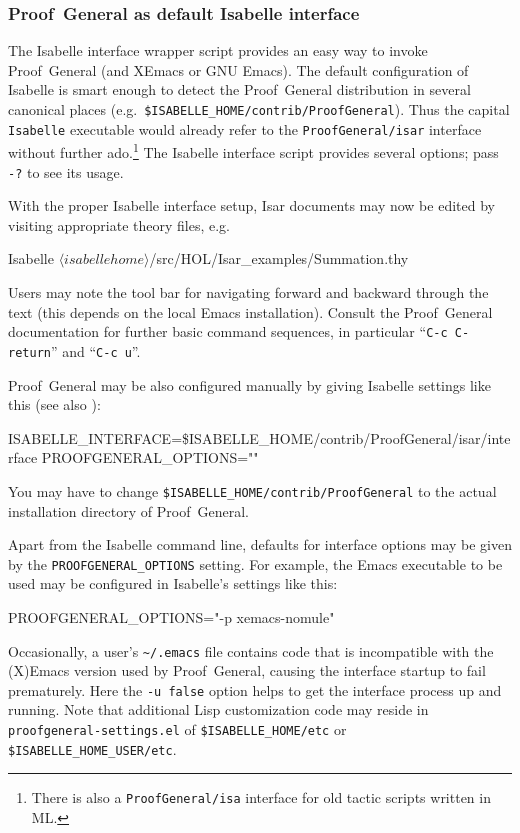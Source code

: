 \subsubsection{Proof~General as default Isabelle interface}

The Isabelle interface wrapper script provides an easy way to invoke
Proof~General (and XEmacs or GNU Emacs).  The default configuration of
Isabelle is smart enough to detect the Proof~General distribution in several
canonical places (e.g.\ \texttt{\$ISABELLE_HOME/contrib/ProofGeneral}).  Thus
the capital \texttt{Isabelle} executable would already refer to the
\texttt{ProofGeneral/isar} interface without further ado.\footnote{There is
  also a \texttt{ProofGeneral/isa} interface for old tactic scripts written in
  ML.} The Isabelle interface script provides several options; pass \verb,-?,
to see its usage.

With the proper Isabelle interface setup, Isar documents may now be edited by
visiting appropriate theory files, e.g.\ 
\begin{ttbox}
Isabelle \({\langle}isabellehome{\rangle}\)/src/HOL/Isar_examples/Summation.thy
\end{ttbox}
Users may note the tool bar for navigating forward and backward through the
text (this depends on the local Emacs installation).  Consult the
Proof~General documentation \cite{proofgeneral} for further basic command
sequences, in particular ``\texttt{C-c C-return}'' and ``\texttt{C-c u}''.

\medskip

Proof~General may be also configured manually by giving Isabelle settings like
this (see also \cite{isabelle-sys}):
\begin{ttbox}
ISABELLE_INTERFACE=\$ISABELLE_HOME/contrib/ProofGeneral/isar/interface
PROOFGENERAL_OPTIONS=""
\end{ttbox}
You may have to change \texttt{\$ISABELLE_HOME/contrib/ProofGeneral} to the
actual installation directory of Proof~General.

\medskip

Apart from the Isabelle command line, defaults for interface options may be
given by the \texttt{PROOFGENERAL_OPTIONS} setting.  For example, the Emacs
executable to be used may be configured in Isabelle's settings like this:
\begin{ttbox}
PROOFGENERAL_OPTIONS="-p xemacs-nomule"  
\end{ttbox}

Occasionally, a user's \verb,~/.emacs, file contains code that is incompatible
with the (X)Emacs version used by Proof~General, causing the interface startup
to fail prematurely.  Here the \texttt{-u false} option helps to get the
interface process up and running.  Note that additional Lisp customization
code may reside in \texttt{proofgeneral-settings.el} of
\texttt{\$ISABELLE_HOME/etc} or \texttt{\$ISABELLE_HOME_USER/etc}.



